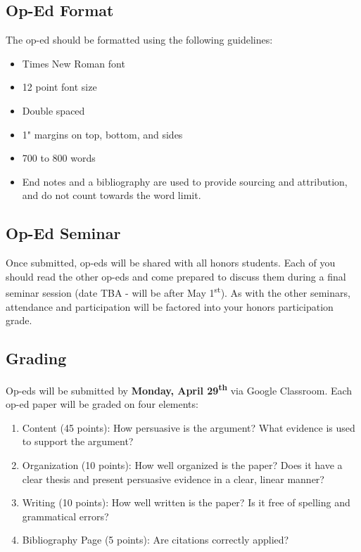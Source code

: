 \documentclass[]{book}
\providecommand{\tightlist}{%
  \setlength{\itemsep}{0pt}\setlength{\parskip}{0pt}}
\begin{document}
\hypertarget{op-ed-format}{%
\subsection{Op-Ed Format}\label{op-ed-format}}

The op-ed should be formatted using the following guidelines:

\begin{itemize}
\tightlist
\item
  Times New Roman font
\item
  12 point font size
\item
  Double spaced
\item
  1" margins on top, bottom, and sides
\item
  700 to 800 words
\item
  End notes and a bibliography are used to provide sourcing and attribution, and do not count towards the word limit.
\end{itemize}

\hypertarget{op-ed-seminar}{%
\subsection{Op-Ed Seminar}\label{op-ed-seminar}}

Once submitted, op-eds will be shared with all honors students. Each of you should read the other op-eds and come prepared to discuss them during a final seminar session (date TBA - will be after May 1\textsuperscript{st}). As with the other seminars, attendance and participation will be factored into your honors participation grade.

\hypertarget{grading-2}{%
\subsection{Grading}\label{grading-2}}

Op-eds will be submitted by \textbf{Monday, April 29\textsuperscript{th}} via Google Classroom. Each op-ed paper will be graded on four elements:

\begin{enumerate}
\def\labelenumi{\arabic{enumi}.}
\tightlist
\item
  Content (45 points): How persuasive is the argument? What evidence is used to support the argument?
\item
  Organization (10 points): How well organized is the paper? Does it
  have a clear thesis and present persuasive evidence in a clear, linear manner?
\item
  Writing (10 points): How well written is the paper? Is it free of
  spelling and grammatical errors?
\item
  Bibliography Page (5 points): Are citations correctly applied?
\end{enumerate}
\end{document}
